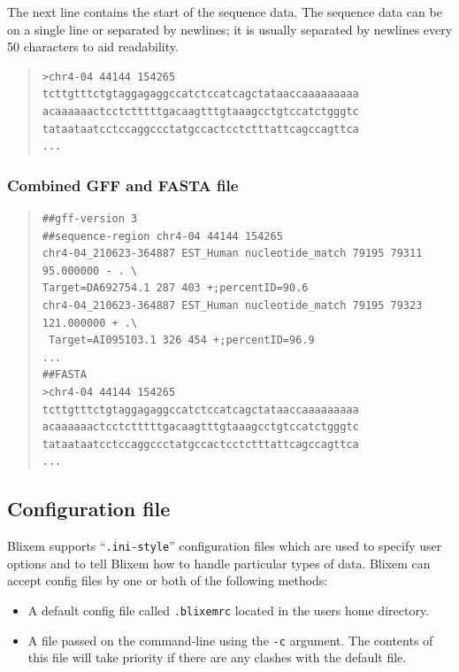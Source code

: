\documentclass[letterpaper]{article}
\newcommand\textstyleSourceText[1]{\texttt{#1}}
\newcommand\liststyleLi{%
\renewcommand\labelitemi{{\textbullet}}
\renewcommand\labelitemii{{\textbullet}}
\renewcommand\labelitemiii{{\textbullet}}
\renewcommand\labelitemiv{{\textbullet}}
}
\begin{document}
{The next line contains the start of the sequence data. The sequence
data can be on a single line or separated by newlines; it is usually
separated by newlines every 50 characters to aid readability.}

\bigskip

\begin{quote}
\begin{verbatim}
>chr4-04 44144 154265
tcttgtttctgtaggagaggccatctccatcagctataaccaaaaaaaaa
acaaaaaactcctctttttgacaagtttgtaaagcctgtccatctgggtc
tataataatcctccaggccctatgccactcctctttattcagccagttca
...
\end{verbatim}
\end{quote}

{\color[rgb]{0.30980393,0.5058824,0.7411765}\subsubsection[Combined GFF and FASTA file]{Combined GFF and FASTA file}}

\begin{quote}
\begin{verbatim}
##gff-version 3
##sequence-region chr4-04 44144 154265
chr4-04_210623-364887 EST_Human nucleotide_match 79195 79311 95.000000 - . \
Target=DA692754.1 287 403 +;percentID=90.6
chr4-04_210623-364887 EST_Human nucleotide_match 79195 79323 121.000000 + .\
 Target=AI095103.1 326 454 +;percentID=96.9
...
##FASTA
>chr4-04 44144 154265
tcttgtttctgtaggagaggccatctccatcagctataaccaaaaaaaaa
acaaaaaactcctctttttgacaagtttgtaaagcctgtccatctgggtc
tataataatcctccaggccctatgccactcctctttattcagccagttca
...
\end{verbatim}
\end{quote}

{\color[rgb]{0.30980393,0.5058824,0.7411765}\subsection[Configuration file]{Configuration file}}
{Blixem supports {\textquotedblleft}\texttt{.ini-style}{\textquotedblright}
configuration files which are used to specify user options and to tell
Blixem how to handle particular types of data. Blixem can accept
config files by one or both of the following methods:}

\liststyleLi
\begin{itemize}
\item {
A default config file called \textstyleSourceText{\texttt{.blixemrc}}
located in the user{\textquotesingle}s home directory. }
\item {
A file passed on the command-line using the
\textstyleSourceText{\texttt{{}-c}} argument. The contents of this file
will take priority if there are any clashes with the default file. }
\end{itemize}
\end{document}
